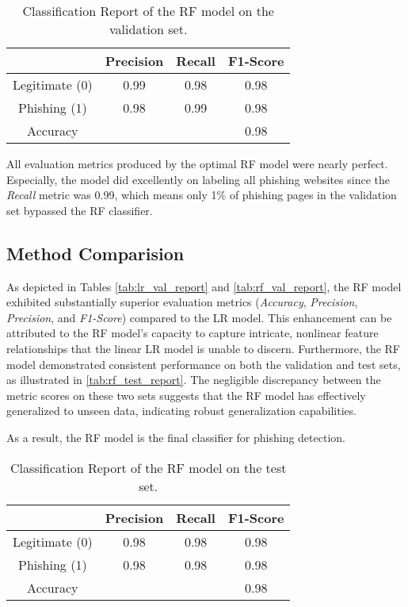 \begin{table}[ht!]
    \centering
    \begin{tabular}{|c|c|c|c|}
        \hline
         & Precision & Recall & F1-Score \\
        \hline
        Legitimate (0) & 0.99 & 0.98 & 0.98 \\
        Phishing (1) & 0.98 & 0.99 & 0.98 \\
        \hline
        Accuracy & & & 0.98  \\
        \hline
    \end{tabular}
    \caption{Classification Report of the RF model on the validation set.}
    \label{tab:rf_val_report}
\end{table}

All evaluation metrics produced by the optimal RF model were nearly perfect.
Especially, the model did excellently on labeling all phishing websites since
the \emph{Recall} metric was 0.99, which means only 1\% of phishing pages
in the validation set bypassed the RF classifier.

\subsection{Method Comparision}
As depicted in Tables \autoref{tab:lr_val_report} and \autoref{tab:rf_val_report}, the RF
model exhibited substantially superior evaluation metrics (\emph{Accuracy}, \emph{Precision}, \emph{Precision},
and \emph{F1-Score}) compared to the LR model. This enhancement can be attributed to the RF
model's capacity to capture intricate, nonlinear feature relationships that the linear
LR model is unable to discern. Furthermore, the RF model demonstrated consistent
performance on both the validation and test sets, as illustrated in \autoref{tab:rf_test_report}.
The negligible discrepancy between the metric scores on these two sets suggests that the
RF model has effectively generalized to unseen data, indicating robust generalization capabilities.

As a result, the RF model is the final classifier for phishing detection.

\begin{table}[ht!]
    \centering
    \begin{tabular}{|c|c|c|c|}
        \hline
         & Precision & Recall & F1-Score \\
        \hline
        Legitimate (0) & 0.98 & 0.98 & 0.98 \\
        Phishing (1) & 0.98 & 0.98 & 0.98 \\
        \hline
        Accuracy & & & 0.98  \\
        \hline
    \end{tabular}
    \caption{Classification Report of the RF model on the test set.}
    \label{tab:rf_test_report}
\end{table}


